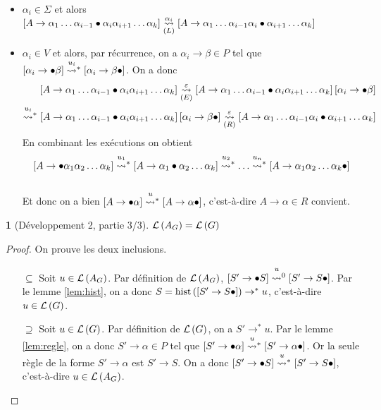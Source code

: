 \documentclass[11pt,a4paper]{article}
\theoremstyle{plain}
\newtheorem{thm}{\protect\theoremname}
\theoremstyle{definition}
\theoremstyle{definition}
\theoremstyle{remark}
\theoremstyle{remark}
\theoremstyle{plain}
\theoremstyle{plain}
\theoremstyle{plain}
\theoremstyle{remark}
\providecommand{\theoremname}{Théorème}
\begin{document}
\begin{itemize}
	\begin{itemize}
		\item $\alpha_{i}\in\Sigma$ et alors $\left[A\to\alpha_{1}\dots\alpha_{i-1}\bullet\alpha_{i}\alpha_{i+1}\dots\alpha_{k}\right]\underset{(L)}{\overset{\alpha_{i}}{\leadsto}}\left[A\to\alpha_{1}\dots\alpha_{i-1}\alpha_{i}\bullet\alpha_{i+1}\dots\alpha_{k}\right]$
		\item $\alpha_{i}\in V$ et alors, par récurrence, on a $\alpha_{i}\to\beta\in P$
		tel que $\left[\alpha_{i}\to\bullet\beta\right]\transitionn{u_{i}}*\left[\alpha_{i}\to\beta\bullet\right]$.
		On a donc
		\begin{align*}
		\left[A\to\alpha_{1}\dots\alpha_{i-1}\bullet\alpha_{i}\alpha_{i+1}\dots\alpha_{k}\right]\underset{(E)}{\transition{\varepsilon}}\left[A\to\alpha_{1}\dots\alpha_{i-1}\bullet\alpha_{i}\alpha_{i+1}\dots\alpha_{k}\right]\left[\alpha_{i}\to\bullet\beta\right]\\
		\transitionn{u_{i}}*\left[A\to\alpha_{1}\dots\alpha_{i-1}\bullet\alpha_{i}\alpha_{i+1}\dots\alpha_{k}\right]\left[\alpha_{i}\to\beta\bullet\right]\underset{(R)}{\transition{\varepsilon}}\left[A\to\alpha_{1}\dots\alpha_{i-1}\alpha_{i}\bullet\alpha_{i+1}\dots\alpha_{k}\right]
		\end{align*}
		En combinant les exécutions on obtient
		\[
		\left[A\to\bullet\alpha_{1}\alpha_{2}\dots\alpha_{k}\right]\transitionn{u_{1}}*\left[A\to\alpha_{1}\bullet\alpha_{2}\dots\alpha_{k}\right]\transitionn{u_{2}}*\dots\transitionn{u_{n}}*\left[A\to\alpha_{1}\alpha_{2}\dots\alpha_{k}\bullet\right]
		\]
		\\
		Et donc on a bien $\left[A\to\bullet\alpha\right]\transitionn u*\left[A\to\alpha\bullet\right]$,
		c'est-à-dire $A\to\alpha\in R$ convient.
	\end{itemize}
\end{itemize}
\begin{thm}[Développement 2, partie 3/3]
	$\mathcal{L}\left(A_{G}\right)=\mathcal{L}\left(G\right)$
\end{thm}
\begin{proof}
	On prouve les deux inclusions.
	\begin{itemize}
		\item[\og $\subseteq$ \fg{}]  Soit $u\in\mathcal{L}\left(A_{G}\right)$. Par définition de $\mathcal{L}\left(A_{G}\right)$,
		$\left[S'\to\bullet S\right]\transitionn u0\left[S'\to S\bullet\right]$.
		Par le lemme \ref{lem:hist}, on a donc $S=\operatorname{hist}\left(\left[S'\to S\bullet\right]\right)\to^{*}u$,
		c'est-à-dire $u\in\mathcal{L}\left(G\right)$.
		\item[\og $\supseteq$ \fg{}]  Soit $u\in\mathcal{L}\left(G\right)$. Par définition de $\mathcal{L}\left(G\right)$,
		on a $S'\to^{*}u$. Par le lemme \ref{lem:regle}, on a donc $S'\to\alpha\in P$
		tel que $\left[S'\to\bullet\alpha\right]\transitionn u*\left[S'\to\alpha\bullet\right]$.
		Or la seule règle de la forme $S'\to\alpha$ est $S'\to S$. On a
		donc $\left[S'\to\bullet S\right]\transitionn u*\left[S'\to S\bullet\right]$,
		c'est-à-dire $u\in\mathcal{L}\left(A_{G}\right)$.
	\end{itemize}
\end{proof}
\end{document}
